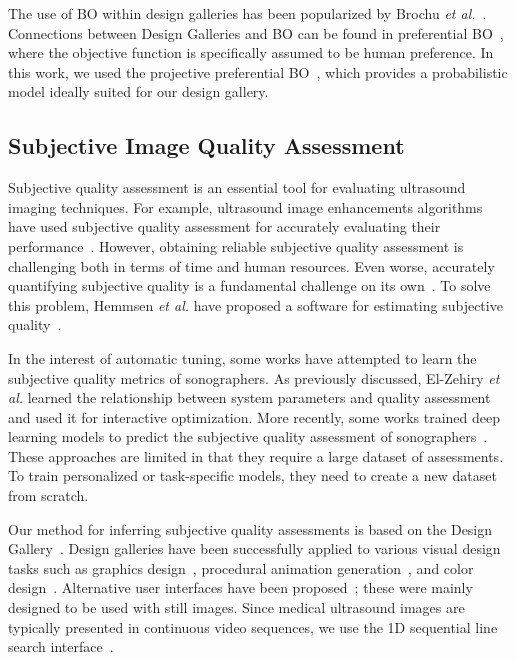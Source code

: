 The use of BO within design galleries has been popularized by Brochu \textit{et al.}~\cite{NIPS2007_b6a1085a, brochu_bayesian_2010}.
Connections between Design Galleries and BO can be found in preferential BO~\cite{pmlr-v70-gonzalez17a}, where the objective function is specifically assumed to be human preference.
In this work, we used the projective preferential BO~\cite{pmlr-v119-mikkola20a}, which provides a probabilistic model ideally suited for our design gallery.

\subsection{Subjective Image Quality Assessment}
Subjective quality assessment is an essential tool for evaluating ultrasound imaging techniques.
For example, ultrasound image enhancements algorithms have used subjective quality assessment for accurately evaluating their performance~\cite{loizou_quality_2006, hemmsen_ultrasound_2010, wong_monte_2012, kang_new_2016, mishra_edge_2018}.
However, obtaining reliable subjective quality assessment is challenging both in terms of time and human resources.
Even worse, accurately quantifying subjective quality is a fundamental challenge on its own~\cite{streijl_mean_2016}.
To solve this problem, Hemmsen \textit{et al.} have proposed a software for estimating subjective quality~\cite{hemmsen_ultrasound_2010}.

In the interest of automatic tuning, some works have attempted to learn the subjective quality metrics of sonographers.
As previously discussed, El-Zehiry \textit{et al.} learned the relationship between system parameters and quality assessment and used it for interactive optimization.
More recently, some works trained deep learning models to predict the subjective quality assessment of sonographers~\cite{abdi_automatic_2017, annangi_ai_2020}.
These approaches are limited in that they require a large dataset of assessments.
To train personalized or task-specific models, they need to create a new dataset from scratch.

Our method for inferring subjective quality assessments is based on the Design Gallery~\cite{10.1145/258734.258887}.
Design galleries have been successfully applied to various visual design tasks such as graphics design~\cite{10.1145/258734.258887}, procedural animation generation~\cite{brochu_bayesian_2010}, and color design~\cite{phan_color_2018}.
Alternative user interfaces have been proposed~\cite{phan_color_2018, 10.1145/3072959.3073598, koyama_sequential_2020}; these were mainly designed to be used with still images.
Since medical ultrasound images are typically presented in continuous video sequences, we use the 1D sequential line search interface~\cite{10.1145/3072959.3073598}.


